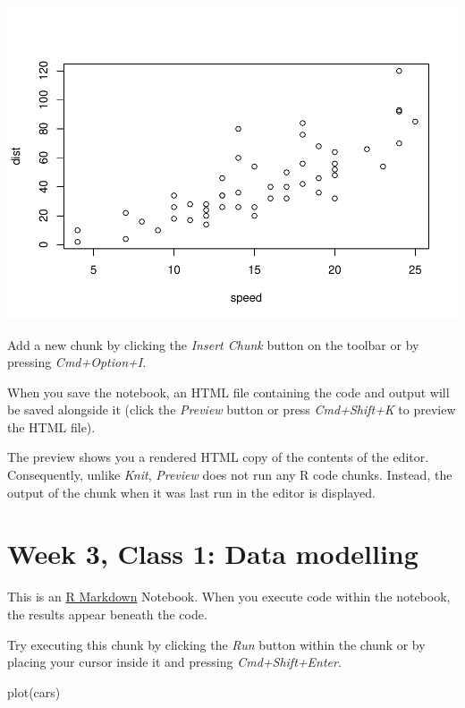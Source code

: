 \documentclass[
]{book}
\newenvironment{Shaded}{\begin{snugshade}}{\end{snugshade}}
\newcommand{\FunctionTok}[1]{\textcolor[rgb]{0.00,0.00,0.00}{#1}}
\newcommand{\NormalTok}[1]{#1}
\begin{document}
\includegraphics{_main_files/figure-latex/unnamed-chunk-30-1.pdf}

Add a new chunk by clicking the \emph{Insert Chunk} button on the toolbar or by pressing \emph{Cmd+Option+I}.

When you save the notebook, an HTML file containing the code and output will be saved alongside it (click the \emph{Preview} button or press \emph{Cmd+Shift+K} to preview the HTML file).

The preview shows you a rendered HTML copy of the contents of the editor. Consequently, unlike \emph{Knit}, \emph{Preview} does not run any R code chunks. Instead, the output of the chunk when it was last run in the editor is displayed.

\hypertarget{week-3-class-1-data-modelling}{%
\chapter{Week 3, Class 1: Data modelling}\label{week-3-class-1-data-modelling}}

This is an \href{http://rmarkdown.rstudio.com}{R Markdown} Notebook. When you execute code within the notebook, the results appear beneath the code.

Try executing this chunk by clicking the \emph{Run} button within the chunk or by placing your cursor inside it and pressing \emph{Cmd+Shift+Enter}.

\begin{Shaded}
\begin{Highlighting}[]
\FunctionTok{plot}\NormalTok{(cars)}
\end{Highlighting}
\end{Shaded}
\end{document}

